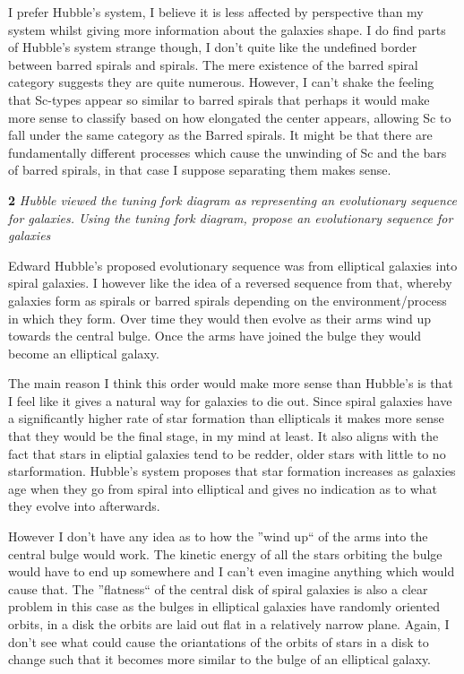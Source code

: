 \documentclass[11pt,a4paper]{article}
\begin{document}
    I prefer Hubble's system, I believe it is less affected by perspective than my system whilst giving more information about the galaxies shape.
    I do find parts of Hubble's system strange though, I don't quite like the undefined border between barred spirals and spirals.
    The mere existence of the barred spiral category suggests they are quite numerous.
    However, I can't shake the feeling that Sc-types appear so similar to barred spirals that perhaps it would make more sense to classify based on how elongated the center appears, allowing Sc to fall under the same category as the Barred spirals.
    It might be that there are fundamentally different processes which cause the unwinding of Sc and the bars of barred spirals, in that case I suppose separating them makes sense.
    
    \textbf{2} \textit{Hubble viewed the tuning fork diagram as representing an evolutionary sequence for galaxies.  Using the tuning fork diagram, propose an evolutionary sequence for galaxies}

    Edward Hubble's proposed evolutionary sequence was from elliptical galaxies into spiral galaxies.
    I however like the idea of a reversed sequence from that, whereby galaxies form as spirals or barred spirals depending on the environment/process in which they form.
    Over time they would then evolve as their arms wind up towards the central bulge.
    Once the arms have joined the bulge they would become an elliptical galaxy.

    The main reason I think this order would make more sense than Hubble's is that I feel like it gives a natural way for galaxies to die out.
    Since spiral galaxies have a significantly higher rate of star formation than ellipticals it makes more sense that they would be the final stage, in my mind at least.
    It also aligns with the fact that stars in eliptial galaxies tend to be redder, older stars with little to no starformation.
    Hubble's system proposes that star formation increases as galaxies age when they go from spiral into elliptical and gives no indication as to what they evolve into afterwards.

    However I don't have any idea as to how the ''wind up`` of the arms into the central bulge would work.
    The kinetic energy of all the stars orbiting the bulge would have to end up somewhere and I can't even imagine anything which would cause that.
    The ''flatness`` of the central disk of spiral galaxies is also a clear problem in this case as the bulges in elliptical galaxies have randomly oriented orbits, in a disk the orbits are laid out flat in a relatively narrow plane.
    Again, I don't see what could cause the oriantations of the orbits of stars in a disk to change such that it becomes more similar to the bulge of an elliptical galaxy.
    
\end{document}
